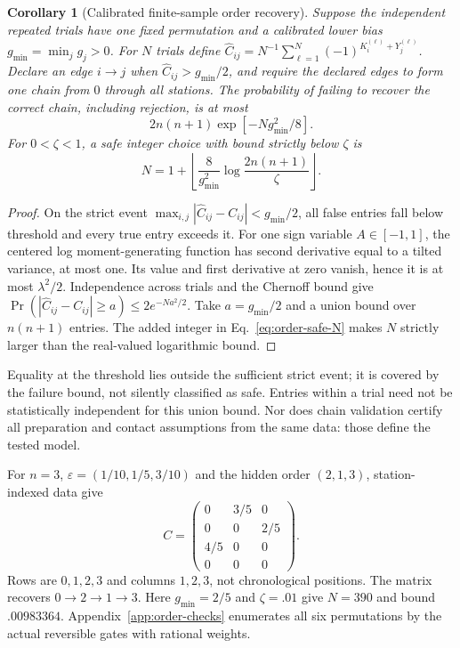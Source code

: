 \documentclass[12pt,a4paper]{article}
\newtheorem{corollary}[theorem]{Corollary}
\begin{document}
\begin{corollary}[Calibrated finite-sample order recovery]
\label{cor:finite-order}
Suppose the independent repeated trials have one fixed permutation and
a calibrated lower bias $g_{\min}=\min_jg_j>0$.
For $N$ trials define
$\widehat C_{ij}=N^{-1}\sum_{\ell=1}^N
(-1)^{K_i^{(\ell)}+Y_j^{(\ell)}}$.
Declare an edge $i\to j$ when $\widehat C_{ij}>g_{\min}/2$,
and require the declared edges to form one chain from $0$ through
all stations. The probability of failing to recover the correct
chain, including rejection, is at most
\begin{equation}
 2n(n+1)\exp[-Ng_{\min}^2/8].
 \label{eq:order-sample-bound}
\end{equation}
For $0<\zeta<1$, a safe integer choice with bound strictly below
$\zeta$ is
\begin{equation}
 N=1+\left\lfloor\frac{8}{g_{\min}^2}
                      \log\frac{2n(n+1)}{\zeta}\right\rfloor .
 \label{eq:order-safe-N}
\end{equation}
\end{corollary}
\begin{proof}
On the strict event
$\max_{i,j}|\widehat C_{ij}-C_{ij}|<g_{\min}/2$,
all false entries fall below threshold and every true entry exceeds it.
For one sign variable $A\in[-1,1]$, the centered log moment-generating
function has second derivative equal to a tilted variance, at most
one. Its value and first derivative at zero vanish, hence it is at
most $\lambda^2/2$. Independence across trials and the Chernoff bound
give
$\Pr(|\widehat C_{ij}-C_{ij}|\ge a)\le2e^{-Na^2/2}$.
Take $a=g_{\min}/2$ and a union bound over $n(n+1)$ entries.
The added integer in Eq.~\eqref{eq:order-safe-N} makes $N$ strictly
larger than the real-valued logarithmic bound.
\end{proof}

Equality at the threshold lies outside the sufficient strict event;
it is covered by the failure bound, not silently classified as safe.
Entries within a trial need not be statistically independent for this
union bound. Nor does chain validation certify all preparation and
contact assumptions from the same data: those define the tested model.

For $n=3$, $\varepsilon=(1/10,1/5,3/10)$ and the hidden order
$(2,1,3)$, station-indexed data give
\begin{equation}
 C=\begin{pmatrix}
 0&3/5&0\\
 0&0&2/5\\
 4/5&0&0\\
 0&0&0
 \end{pmatrix}.
 \label{eq:order-example}
\end{equation}
Rows are $0,1,2,3$ and columns $1,2,3$, not chronological positions.
The matrix recovers $0\to2\to1\to3$.
Here $g_{\min}=2/5$ and $\zeta=.01$ give $N=390$ and bound
$.00983364$. Appendix~\ref{app:order-checks} enumerates all six
permutations by the actual reversible gates with rational weights.
\end{document}
